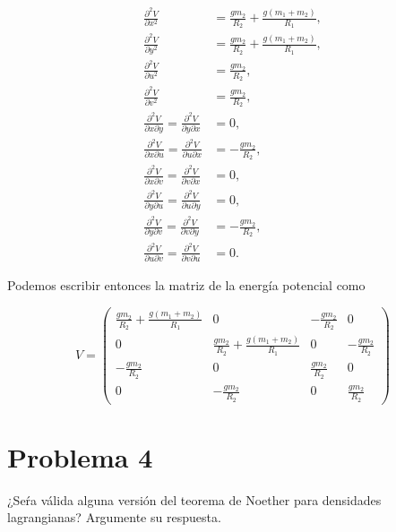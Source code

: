 \documentclass[a4paper,10pt]{article}
\numberwithin{equation}{section}
\begin{document}
\begin{align*}
 \frac{\partial^2 V}{\partial x^2} &= \frac{gm_2}{R_2} + \frac{g(m_1 + m_2)}{R_1}, \\
 \frac{\partial^2 V}{\partial y^2} &= \frac{gm_2}{R_2} + \frac{g(m_1 + m_2)}{R_1}, \\
 \frac{\partial^2 V}{\partial u^2} &= \frac{gm_2}{R_2}, \\
 \frac{\partial^2 V}{\partial v^2} &= \frac{gm_2}{R_2}, \\
 \frac{\partial^2 V}{\partial x\partial y} = \frac{\partial^2 V}{\partial y \partial x}&= 0, \\
 \frac{\partial^2 V}{\partial x \partial u} = \frac{\partial^2 V}{\partial u \partial x}  &= - \frac{gm_2}{R_2}, \\
 \frac{\partial^2 V}{\partial x \partial v} =  \frac{\partial^2 V}{\partial v \partial x} &= 0, \\
 \frac{\partial^2 V}{\partial y \partial u} =  \frac{\partial^2 V}{\partial u \partial y} &= 0, \\
 \frac{\partial^2 V}{\partial y \partial v} =  \frac{\partial^2 V}{\partial v \partial y} &= -\frac{gm_2}{R_2} , \\ 
 \frac{\partial^2 V}{\partial u \partial v} =  \frac{\partial^2 V}{\partial v \partial u} &= 0.
\end{align*}

Podemos escribir entonces la matriz de la energía potencial como

\begin{equation}
 V = \begin{pmatrix}
      \frac{gm_2}{R_2} + \frac{g(m_1 + m_2)}{R_1} & 0 & - \frac{gm_2}{R_2} & 0 \\
      0 & \frac{gm_2}{R_2} + \frac{g(m_1 + m_2)}{R_1} & 0 & - \frac{gm_2}{R_2} \\
      - \frac{gm_2}{R_2} & 0 & \frac{gm_2}{R_2} & 0 \\
      0 & - \frac{gm_2}{R_2} & 0 & \frac{gm_2}{R_2}
     \end{pmatrix}
\end{equation}


\section{Problema 4}

¿Seŕa válida alguna versión del teorema de Noether para densidades lagrangianas? Argumente 
su respuesta.

\vspace{.3cm}
\end{document}

